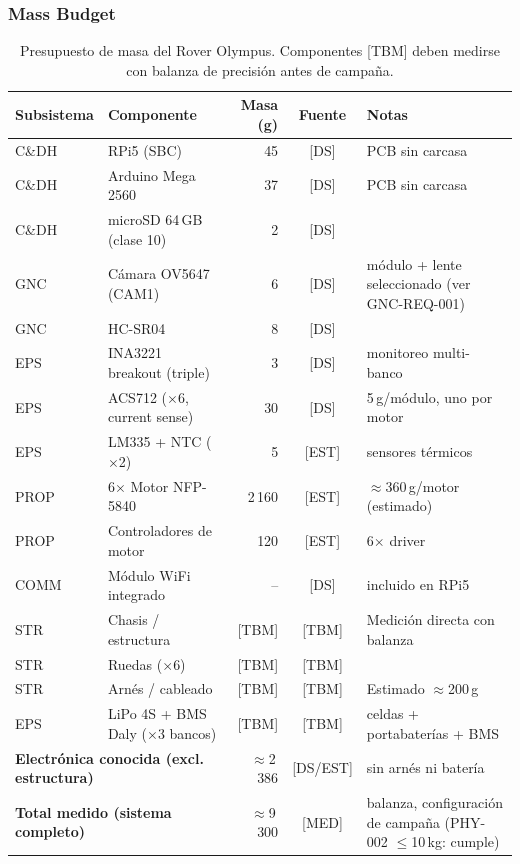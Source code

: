 \subsubsection{Mass Budget}

\begin{table}[H]
\centering
\scriptsize
\renewcommand{\arraystretch}{1.3}
\begin{tabularx}{\textwidth}{| l | l | r | c | X |}
\hline
\textbf{Subsistema} & \textbf{Componente} & \textbf{Masa (g)} & \textbf{Fuente} & \textbf{Notas} \\ \hline

C\&DH  & RPi5 (SBC)                & 45    & [DS]  & PCB sin carcasa \\ \hline
C\&DH  & Arduino Mega 2560         & 37    & [DS]  & PCB sin carcasa \\ \hline
C\&DH  & microSD 64\,GB (clase 10) & 2     & [DS]  & \\ \hline
GNC    & Cámara OV5647 (CAM1)      & 6     & [DS]  & módulo + lente seleccionado (ver GNC-REQ-001) \\ \hline
GNC    & HC-SR04                   & 8     & [DS]  & \\ \hline
EPS    & INA3221 breakout (triple) & 3     & [DS]  & monitoreo multi-banco \\ \hline
EPS    & ACS712 ($\times$6, current sense) & 30 & [DS] & 5\,g/módulo, uno por motor \\ \hline
EPS    & LM335 + NTC ($\times$2)   & 5     & [EST] & sensores térmicos \\ \hline
PROP   & 6$\times$ Motor NFP-5840  & 2\,160 & [EST] & $\approx$360\,g/motor (estimado) \\ \hline
PROP   & Controladores de motor    & 120   & [EST] & 6$\times$ driver \\ \hline
COMM   & Módulo WiFi integrado     & --    & [DS]  & incluido en RPi5 \\ \hline
STR    & Chasis / estructura       & {[TBM]} & [TBM] & Medición directa con balanza \\ \hline
STR    & Ruedas ($\times$6)        & {[TBM]} & [TBM] & \\ \hline
STR    & Arnés / cableado          & {[TBM]} & [TBM] & Estimado $\approx$200\,g \\ \hline
EPS    & LiPo 4S + BMS Daly ($\times$3 bancos) & {[TBM]} & [TBM] & celdas + portabaterías + BMS \\ \hline
\hline
\multicolumn{2}{|l|}{\textbf{Electrónica conocida (excl. estructura)}} & $\approx$2\,386 & [DS/EST] & sin arnés ni batería \\ \hline
\multicolumn{2}{|l|}{\textbf{Total medido (sistema completo)}}       & $\approx$9\,300 & [MED] & balanza, configuración de campaña (PHY-002 $\le$10\,kg: cumple) \\ \hline
\end{tabularx}
\caption{Presupuesto de masa del Rover Olympus. Componentes [TBM] deben medirse con balanza de precisión antes de campaña.}
\label{tab:mass_budget}
\end{table}

